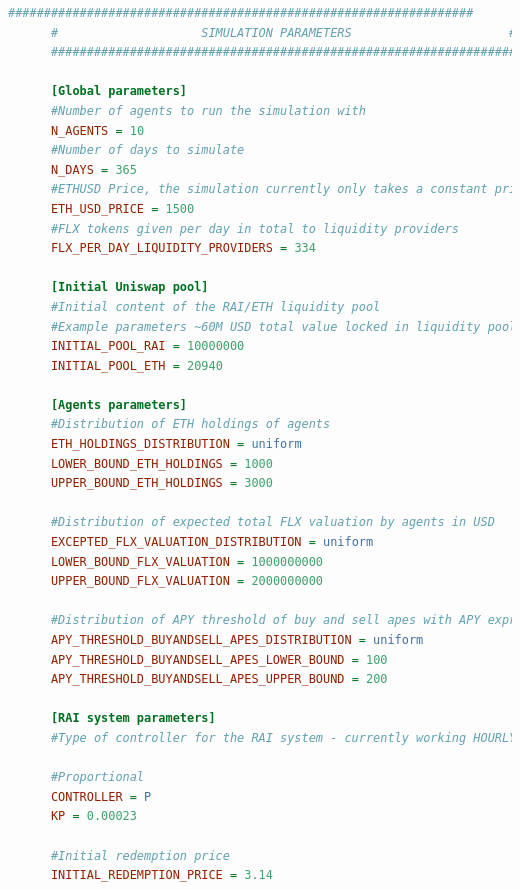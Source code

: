 \documentclass{article}
\begin{document}
    \begin{lstlisting}[language=ini]
      #################################################################
      #                    SIMULATION PARAMETERS                      #
      #################################################################

      [Global parameters]
      #Number of agents to run the simulation with
      N_AGENTS = 10
      #Number of days to simulate
      N_DAYS = 365
      #ETHUSD Price, the simulation currently only takes a constant price
      ETH_USD_PRICE = 1500
      #FLX tokens given per day in total to liquidity providers
      FLX_PER_DAY_LIQUIDITY_PROVIDERS = 334

      [Initial Uniswap pool]
      #Initial content of the RAI/ETH liquidity pool
      #Example parameters ~60M USD total value locked in liquidity pool
      INITIAL_POOL_RAI = 10000000
      INITIAL_POOL_ETH = 20940

      [Agents parameters]
      #Distribution of ETH holdings of agents
      ETH_HOLDINGS_DISTRIBUTION = uniform
      LOWER_BOUND_ETH_HOLDINGS = 1000
      UPPER_BOUND_ETH_HOLDINGS = 3000

      #Distribution of expected total FLX valuation by agents in USD
      EXCEPTED_FLX_VALUATION_DISTRIBUTION = uniform
      LOWER_BOUND_FLX_VALUATION = 1000000000
      UPPER_BOUND_FLX_VALUATION = 2000000000

      #Distribution of APY threshold of buy and sell apes with APY expressed in %
      APY_THRESHOLD_BUYANDSELL_APES_DISTRIBUTION = uniform
      APY_THRESHOLD_BUYANDSELL_APES_LOWER_BOUND = 100
      APY_THRESHOLD_BUYANDSELL_APES_UPPER_BOUND = 200

      [RAI system parameters]
      #Type of controller for the RAI system - currently working HOURLY, choose parameter accordingly

      #Proportional
      CONTROLLER = P 
      KP = 0.00023

      #Initial redemption price
      INITIAL_REDEMPTION_PRICE = 3.14
    \end{lstlisting}
\end{document}
